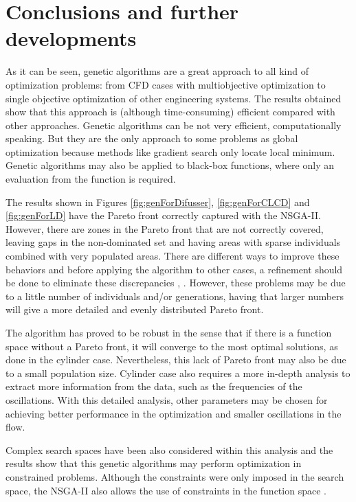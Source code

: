 \chapter{Conclusions and further developments}

As it can be seen, genetic algorithms are a great approach to all kind of optimization problems: from CFD cases with multiobjective optimization to single objective optimization of other engineering systems. The results obtained show that this approach is (although time-consuming) efficient compared with other approaches. Genetic algorithms can be not very efficient, computationally speaking. But they are the only approach to some problems as global optimization because methods like gradient search only locate local minimum. Genetic algorithms may also be applied to black-box functions, where only an evaluation from the function is required. 

The results shown in Figures \ref{fig:genForDifusser}, \ref{fig:genForCLCD} and \ref{fig:genForLD} have the Pareto front correctly captured with the NSGA-II. However, there are zones in the Pareto front that are not correctly covered, leaving gaps in the non-dominated set and having areas with sparse individuals combined with very populated areas. There are different ways to improve these behaviors and before applying the algorithm to other cases, a refinement should be done to eliminate these discrepancies \cite{chichakly2013improving}, \cite{yuan2014improved}. However, these problems may be due to a little number of individuals and/or generations, having that larger numbers will give a more detailed and evenly distributed Pareto front.

The algorithm has proved to be robust in the sense that if there is a function space without a Pareto front, it will converge to the most optimal solutions, as done in the cylinder case. Nevertheless, this lack of Pareto front may also be due to a small population size. Cylinder case also requires a more in-depth analysis to extract more information from the data, such as the frequencies of the oscillations. With this detailed analysis, other parameters may be chosen for achieving better performance in the optimization and smaller oscillations in the flow.

Complex search spaces have been also considered within this analysis and the results show that this genetic algorithms may perform optimization in constrained problems. Although the constraints were only imposed in the search space, the NSGA-II also allows the use of constraints in the function space \cite{deb2002fast}.


